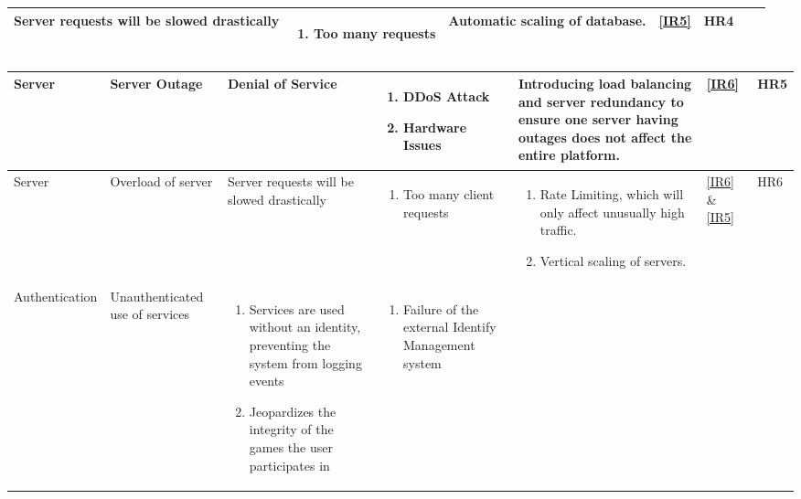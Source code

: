 \documentclass{article}
\begin{document}
\begin{landscape}
\begin{table}[H]
\begin{tabularx}{1.46\textwidth}{|p{2.3cm}|p{2.3cm}|p{3.5cm}|p{4.4cm}|p{4.5cm}|p{1cm}|p{1cm}|}
        Server requests will be slowed drastically & 
        \begin{enumerate}
            \item Too many requests
        \end{enumerate} &
        Automatic scaling of database. &
        \ref{IR5}&
        HR4 \\ \hline
    \end{tabularx}
\end{table}
\begin{table}[H]
    \begin{tabularx}{1.46\textwidth}{|p{2.3cm}|p{2.3cm}|p{3.5cm}|p{4.4cm}|p{4.5cm}|p{1cm}|p{1cm}|}
        \hline
        Server	 & 
        Server Outage	 & 
        Denial of Service & 
        \begin{enumerate}
            \item DDoS Attack
            \item Hardware Issues
        \end{enumerate} &
        Introducing load balancing and server redundancy to ensure one server having outages does not affect the entire platform.
        &\ref{IR6} &
        HR5 
        \\\hline
        Server	 & 
        Overload of server	 & 
        Server requests will be slowed drastically & 
        \begin{enumerate}
            \item Too many client requests
        \end{enumerate} &
        \begin{enumerate}
            \item Rate Limiting, which will only affect unusually high traffic.
            \item Vertical scaling of servers.
        \end{enumerate}
        &
        \ref{IR6} \& \ref{IR5} & 
        HR6\\
        \hline
        Authentication & 
        Unauthenticated use of services & 
        \begin{enumerate}
            \item Services are used without an identity, preventing the system from logging events
            \item Jeopardizes the integrity of the games the user participates in
        \end{enumerate} & 
        \begin{enumerate}
            \item Failure of the external Identify Management system

\end{enumerate}
\end{tabularx}
\end{table}
\end{landscape}
\end{document}
